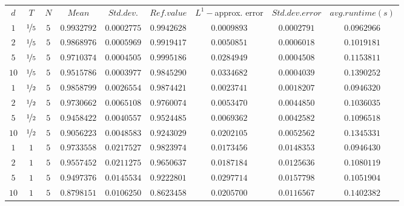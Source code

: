 \begin{tabular}{ccccccccc}
$d$ & $T$ & $N$ & $Mean$ & $Std. dev.$ & $Ref. value$ & $L^1-$approx. error & $Std. dev. error$ & $avg. runtime (s)$\\
$1$ & $\nicefrac{1}{5}$ & $5$ & $0.9932792$ & $0.0002775$ & $0.9942628$ & $0.0009893$ & $0.0002791$ & $0.0962966$\\
$2$ & $\nicefrac{1}{5}$ & $5$ & $0.9868976$ & $0.0005969$ & $0.9919417$ & $0.0050851$ & $0.0006018$ & $0.1019181$\\
$5$ & $\nicefrac{1}{5}$ & $5$ & $0.9710374$ & $0.0004505$ & $0.9995186$ & $0.0284949$ & $0.0004508$ & $0.1153811$\\
$10$ & $\nicefrac{1}{5}$ & $5$ & $0.9515786$ & $0.0003977$ & $0.9845290$ & $0.0334682$ & $0.0004039$ & $0.1390252$\\
$1$ & $\nicefrac{1}{2}$ & $5$ & $0.9858799$ & $0.0026554$ & $0.9874421$ & $0.0023741$ & $0.0018207$ & $0.0946320$\\
$2$ & $\nicefrac{1}{2}$ & $5$ & $0.9730662$ & $0.0065108$ & $0.9760074$ & $0.0053470$ & $0.0044850$ & $0.1036035$\\
$5$ & $\nicefrac{1}{2}$ & $5$ & $0.9458422$ & $0.0040557$ & $0.9524485$ & $0.0069362$ & $0.0042582$ & $0.1096518$\\
$10$ & $\nicefrac{1}{2}$ & $5$ & $0.9056223$ & $0.0048583$ & $0.9243029$ & $0.0202105$ & $0.0052562$ & $0.1345331$\\
$1$ & $1$ & $5$ & $0.9733558$ & $0.0217527$ & $0.9823974$ & $0.0173456$ & $0.0148353$ & $0.0946430$\\
$2$ & $1$ & $5$ & $0.9557452$ & $0.0211275$ & $0.9650637$ & $0.0187184$ & $0.0125636$ & $0.1080119$\\
$5$ & $1$ & $5$ & $0.9497376$ & $0.0145534$ & $0.9222801$ & $0.0297714$ & $0.0157798$ & $0.1051904$\\
$10$ & $1$ & $5$ & $0.8798151$ & $0.0106250$ & $0.8623458$ & $0.0205700$ & $0.0116567$ & $0.1402382$\\
\end{tabular}
